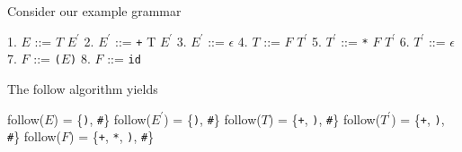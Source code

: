 \documentclass[8pt,a4paper,compress]{beamer}
\newcommand{\mm}[1]{$#1$}
\newcommand{\expo}[2]{$#1^{#2}$}
\newenvironment{spaced}
{
\smallskip
\hspace{.5cm}
\begin{minipage}[c]{\textwidth}
}
{
\end{minipage}
\smallskip
}
\begin{document}
\begin{frame}[fragile]
\pause

Consider our example grammar

\text{ }
\begin{spaced}
\begin{production}
1. \mm{E}  ::= \mm{T} \expo{E}{\prime}
2. \expo{E}{\prime} ::= \lstinline{+} T \expo{E}{\prime}
3. \expo{E}{\prime} ::= \mm{\epsilon}
4. \mm{T}  ::= \mm{F} \expo{T}{\prime}
5. \expo{T}{\prime} ::= \lstinline{*} \mm{F} \expo{T}{\prime}
6. \expo{T}{\prime} ::= \mm{\epsilon}
7. \mm{F}  ::= \lstinline{(}\mm{E}\lstinline{)}
8. \mm{F}  ::= \lstinline{id}
\end{production}
\end{spaced}

\pause
\bigskip

The follow algorithm yields

\text{ }
\begin{spaced}
\begin{production}
follow(\mm{E})  = \{\lstinline{)}, \lstinline{#}\}
follow(\expo{E}{\prime}) = \{\lstinline{)}, \lstinline{#}\}
follow(\mm{T})  = \{\lstinline{+}, \lstinline{)},  \lstinline{#}\}
follow(\expo{T}{\prime}) = \{\lstinline{+}, \lstinline{)}, \lstinline{#}\}
follow(\mm{F})  = \{\lstinline{+}, \lstinline{*}, \lstinline{)}, \lstinline{#}\}
\end{production}
\end{spaced}
\end{frame}
\end{document}
